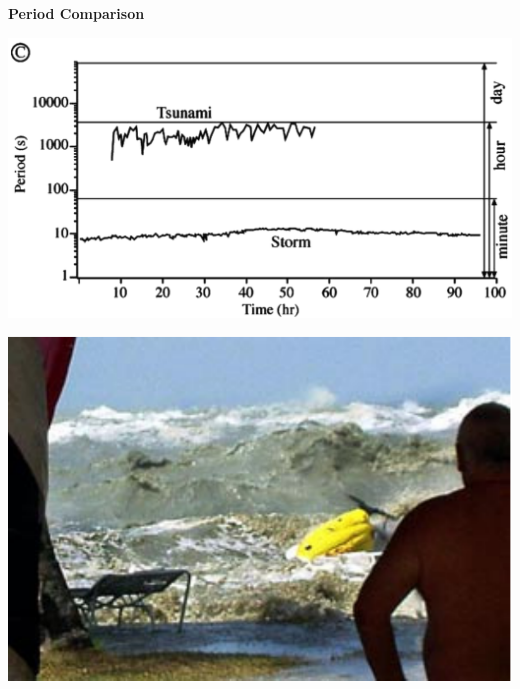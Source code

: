 \documentclass{beamer}
\begin{document}
\begin{frame}[t]
\begin{center}
\textbf{\huge Period Comparison}

  \vspace*{3.5em} \includegraphics[scale=0.25]{STTS_Periodt.png} \\
\end{center}
\end{frame}

\begin{frame}[t]
\begin{center}
  \vspace*{3.5em} \includegraphics[scale=0.85]{loaded.pdf} \\
\end{center}
\end{frame}
\end{document}
